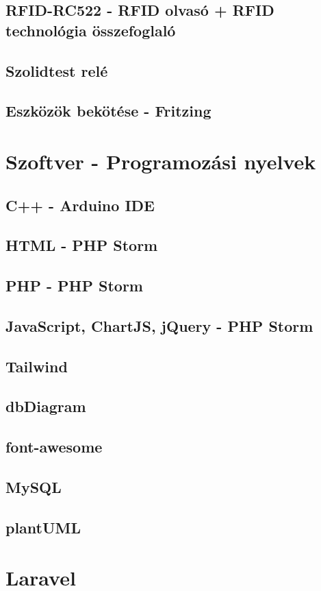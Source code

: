 \documentclass[
]{thesis-ekf}
\theoremstyle{definition}
\theoremstyle{remark}
\begin{document}
	\subsection{RFID-RC522 - RFID olvasó + RFID technológia összefoglaló}
	\subsection{Szolidtest relé}
	\subsection{Eszközök bekötése - Fritzing}
	
	\section{Szoftver - Programozási nyelvek}
	\subsection{C++ - Arduino IDE}
	\subsection{HTML - PHP Storm}
	\subsection{PHP - PHP Storm}
	\subsection{JavaScript, ChartJS, jQuery - PHP Storm}
	\subsection{Tailwind}
	\subsection{dbDiagram}
	\subsection{font-awesome}
	\subsection{MySQL}
	\subsection{plantUML}
	\section{Laravel}
\end{document}
